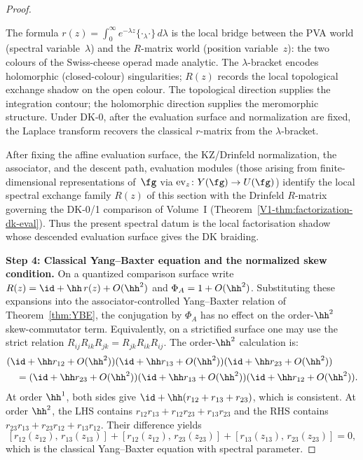 \begin{proof}
\begin{remark}
\label{rem:laplace-spectral-duality}
The formula $r(z) = \int_0^\infty e^{-\lambda z} \{\cdot{}_\lambda \cdot\}\, d\lambda$ is the local bridge between the PVA world (spectral variable~$\lambda$) and the $R$-matrix world (position variable~$z$): the two colours of the Swiss-cheese operad made analytic. The $\lambda$-bracket encodes holomorphic (closed-colour) singularities; $R(z)$ records the local topological exchange shadow on the open colour. The topological direction supplies the integration contour; the holomorphic direction supplies the meromorphic structure. Under DK-0, after the evaluation surface and normalization are fixed, the Laplace transform recovers the classical $r$-matrix from the $\lambda$-bracket.
\end{remark}

\begin{remark}
\label{rem:spectral-R-dk-specialization}
After fixing the affine evaluation surface, the KZ/Drinfeld
normalization, the associator, and the descent path, evaluation modules
(those arising from finite-dimensional representations of~$\fg$ via
$\mathrm{ev}_z \colon Y(\fg) \to U(\fg)$) identify the local spectral
exchange family \(R(z)\) of this section with the Drinfeld \(R\)-matrix
governing the DK-0/1 comparison of Volume~I
(Theorem~\ref*{V1-thm:factorization-dk-eval}). Thus the present
spectral datum is the local factorisation shadow whose descended
evaluation surface gives the DK braiding.
\end{remark}

\medskip
\noindent\textbf{Step 4: Classical Yang--Baxter equation and the normalized skew condition.}
On a quantized comparison surface write
$R(z)=\id+\hh\,r(z)+O(\hh^2)$ and
$\Phi_A=1+O(\hh^2)$.  Substituting these expansions into the
associator-controlled Yang--Baxter relation of
Theorem~\ref{thm:YBE}, the conjugation by \(\Phi_A\) has no effect on
the order-\(\hh^2\) skew-commutator term.  Equivalently, on a
strictified surface one may use the strict relation
$R_{ij}R_{ik}R_{jk}=R_{jk}R_{ik}R_{ij}$.  The order-\(\hh^2\)
calculation is:
\begin{align*}
&(\id + \hh r_{12} + O(\hh^2))(\id + \hh r_{13} + O(\hh^2))(\id + \hh r_{23} + O(\hh^2)) \\
&\quad = (\id + \hh r_{23} + O(\hh^2))(\id + \hh r_{13} + O(\hh^2))(\id + \hh r_{12} + O(\hh^2)).
\end{align*}
At order $\hh^1$, both sides give $\id + \hh(r_{12} + r_{13} + r_{23})$, which is consistent. At order $\hh^2$, the LHS contains $r_{12}r_{13} + r_{12}r_{23} + r_{13}r_{23}$ and the RHS contains $r_{23}r_{13} + r_{23}r_{12} + r_{13}r_{12}$. Their difference yields
\[
[r_{12}(z_{12}),\, r_{13}(z_{13})] + [r_{12}(z_{12}),\, r_{23}(z_{23})] + [r_{13}(z_{13}),\, r_{23}(z_{23})] = 0,
\]
which is the classical Yang--Baxter equation with spectral parameter.


\end{proof}
